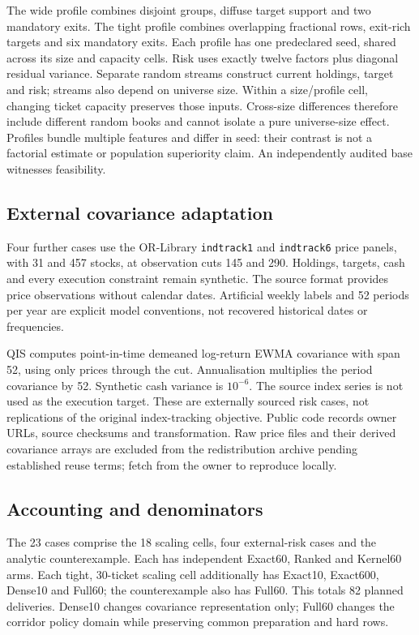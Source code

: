 \documentclass[11pt]{article}
\begin{document}
The wide profile combines disjoint groups, diffuse target support and two
mandatory exits. The tight profile combines overlapping fractional rows,
exit-rich targets and six mandatory exits. Each profile has one predeclared
seed, shared across its size and capacity cells. Risk uses exactly twelve
factors plus diagonal residual variance. Separate random streams construct
current holdings, target and risk; streams also depend on universe size.
Within a size/profile cell, changing ticket capacity preserves those inputs.
Cross-size differences therefore include different random books and cannot
isolate a pure universe-size effect. Profiles bundle multiple features and
differ in seed: their contrast is not a factorial estimate or population
superiority claim. An independently audited base witnesses feasibility.

\subsection{External covariance adaptation}
Four further cases use the OR-Library \texttt{indtrack1} and
\texttt{indtrack6} price panels, with 31 and 457 stocks, at observation cuts
145 and 290. Holdings, targets, cash and every execution constraint remain
synthetic. The source format provides price observations without calendar
dates. Artificial weekly labels and 52 periods per year are explicit model
conventions, not recovered historical dates or frequencies.

QIS computes point-in-time demeaned log-return EWMA covariance with span 52,
using only prices through the cut. Annualisation multiplies the period
covariance by 52. Synthetic cash variance is $10^{-6}$. The source index
series is not used as the execution target. These are externally sourced
risk cases, not replications of the original index-tracking objective.
Public code records owner URLs, source checksums and transformation. Raw
price files and their derived covariance arrays are excluded from the
redistribution archive pending established reuse terms; fetch from the owner
to reproduce locally.

\subsection{Accounting and denominators}
The 23 cases comprise the 18 scaling cells, four external-risk cases and the
analytic counterexample. Each has independent Exact60, Ranked and Kernel60
arms. Each tight, 30-ticket scaling cell additionally has Exact10, Exact600,
Dense10 and Full60; the counterexample also has Full60. This totals 82
planned deliveries. Dense10 changes covariance representation only; Full60
changes the corridor policy domain while preserving common preparation and
hard rows.
\end{document}
